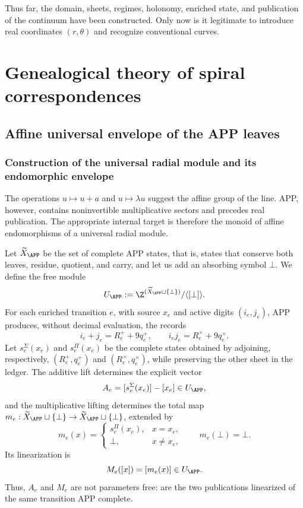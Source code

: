 \begin{resultbox}[title={Causal antecedence of the discrete continuum with respect to the radial reader}]
Thus far, the domain, sheets, regimes,
holonomy, enriched state, and publication of the continuum have been constructed. Only now
is it legitimate to introduce real coordinates \((r,\theta)\) and recognize conventional
curves.
\end{resultbox}
\part{Genealogical theory of spiral correspondences}

\chapter{Affine universal envelope of the APP leaves}

\section{Construction of the universal radial module and its endomorphic envelope}

The operations \(u\mapsto u+a\) and \(u\mapsto\lambda u\) suggest the
affine group of the line. APP, however, contains noninvertible multiplicative
sectors and precedes real publication. The appropriate internal target
is therefore the monoid of affine endomorphisms of a universal radial module.

Let \(\widetilde X_{\APP}\) be the set of complete APP states, that is,
states that conserve both leaves, residue, quotient, and carry, and let us add an
absorbing symbol \(\bot\). We define the free module
\begin{equation}
 U_{\APP}:=\Z^{(\widetilde X_{\APP}\sqcup\{\bot\})}/\langle[\bot]\rangle.
 \label{espiral:eq:modulo-radial-universal}
\end{equation}
For each enriched transition \(e\), with source \(x_e\) and active digits
\((i_e,j_e)\), APP produces, without decimal evaluation, the records
\[
 i_e+j_e=R_e^++9q_e^+,
 \qquad
 i_ej_e=R_e^\times+9q_e^\times.
\]
Let \(s_e^\Sigma(x_e)\) and \(s_e^\Pi(x_e)\) be the complete states obtained
by adjoining, respectively, \((R_e^+,q_e^+)\) and
\((R_e^\times,q_e^\times)\), while preserving the other sheet in the ledger. The
additive lift determines the explicit vector
\[
 A_e=[s_e^\Sigma(x_e)]-[x_e]\in U_{\APP},
\]
and the multiplicative lifting determines the total map
\(m_e:\widetilde X_{\APP}\sqcup\{\bot\}\to
\widetilde X_{\APP}\sqcup\{\bot\}\), extended by
\[
 m_e(x)=
 \begin{cases}
 s_e^\Pi(x_e),&x=x_e,\\
 \bot,&x\neq x_e,
 \end{cases}
 \qquad m_e(\bot)=\bot.
\]
Its linearization is
\[
 M_e([x])=[m_e(x)]\in U_{\APP}.
\]
Thus, \(A_e\) and \(M_e\) are not parameters free: are the two publications
linearized of the same transition APP complete.


